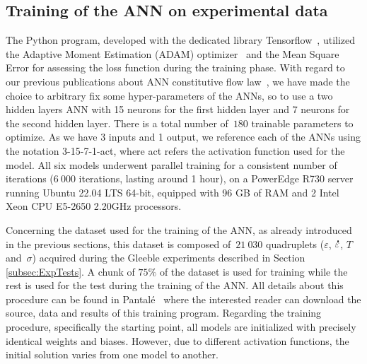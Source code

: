 \documentclass[algorithms,article,submit,pdftex,oneauthors]{Definitions/mdpi}
\DeclareRobustCommand{\mdot}[1]{\accentset{\mbox{\bfseries .}}{#1}}
\begin{document}
\subsection{Training of the ANN on experimental data}\label{subsec:train}

The Python program, developed with the dedicated library Tensorflow~\cite{Tensorflow-2015}, utilized the Adaptive Moment Estimation (ADAM) optimizer~\cite{Kingma-2015-AMS} and the Mean Square Error for assessing the loss function during the training phase.
With regard to our previous publications about ANN constitutive flow law~\cite{Pantale-2021-EIN}, we have made the choice to arbitrary fix some hyper-parameters of the ANNs, so to use a two hidden layers ANN with 15 neurons for the first hidden layer and 7 neurons for the second hidden layer.
There is a total number of~$180$ trainable parameters to optimize.
As we have 3 inputs and 1 output, we reference each of the ANNs using the notation 3-15-7-1-act, where act refers the activation function used for the model.
All six models underwent parallel training for a consistent number of iterations ($6~000$ iterations, lasting around 1 hour), on a PowerEdge R730 server running Ubuntu 22.04 LTS 64-bit, equipped with 96 GB of RAM and 2 Intel Xeon CPU E5-2650 2.20GHz processors.

Concerning the dataset used for the training of the ANN, as already introduced in the previous sections, this dataset is composed of~$21~030$ quadruplets ($\varepsilon$, $\mdot{\varepsilon}$, $T$ and~$\sigma$) acquired during the Gleeble experiments described in Section \ref{subsec:ExpTests}.
A chunk of $75\%$ of the dataset is used for training while the rest is used for the test during the training of the ANN.
All details about this procedure can be found in Pantalé~\cite{Pantale-2023-SSF} where the interested reader can download the source, data and results of this training program.
Regarding the training procedure, specifically the starting point, all models are initialized with precisely identical weights and biases.
However, due to different activation functions, the initial solution varies from one model to another.
\end{document}

